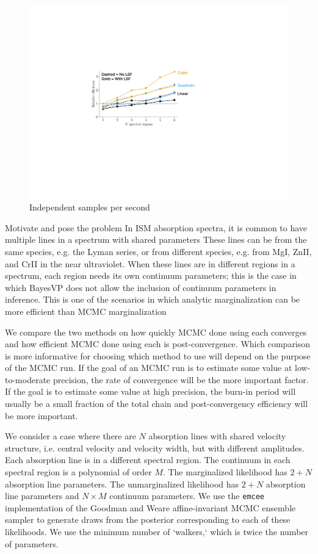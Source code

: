 \documentclass[manuscript]{aastex62}
\begin{document}
\begin{figure}
  \includegraphics{efficiency.pdf}
  \caption{Independent samples per second}
  \label{fig:efficiency-comparison}
\end{figure}

Motivate and pose the problem
In ISM absorption spectra, it is common to have multiple lines in a spectrum with shared parameters
These lines can be from the same species, e.g. the Lyman series, or from different species, e.g. from Mg\small{I}, Zn\small{II}, and Cr\small{II} in the near ultraviolet.
When these lines are in different regions in a spectrum, each region needs its own continuum parameters; this is the case in which BayesVP does not allow the inclusion of continuum parameters in inference.
This is one of the scenarios in which analytic marginalization can be more efficient than MCMC marginalization

We compare the two methods on how quickly MCMC done using each converges and how efficient MCMC done using each is post-convergence.
Which comparison is more informative for choosing which method to use will depend on the purpose of the MCMC run.
If the goal of an MCMC run is to estimate some value at low-to-moderate precision, the rate of convergence will be the more important factor.
If the goal is to estimate some value at high precision, the burn-in period will usually be a small fraction of the total chain and post-convergency efficiency will be more important.

We consider a case where there are $N$ absorption lines with shared velocity structure, i.e. central velocity and velocity width, but with different amplitudes.
Each absorption line is in a different spectral region.
The continuum in each spectral region is a polynomial of order $M$.
The marginalized likelihood has $2 + N$ absorption line parameters.
The unmarginalized likelihood has $2 + N$ absorption line parameters and $N \times M$ continuum parameters.
We use the \texttt{emcee} implementation of the Goodman and Weare affine-invariant MCMC ensemble sampler to generate draws from the posterior corresponding to each of these likelihoods.
We use the minimum number of `walkers,` which is twice the number of parameters.
\end{document}
